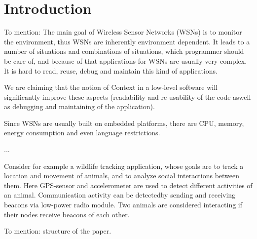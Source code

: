 \section{Introduction} To mention: The main goal of Wireless Sensor Networks
(WSNs) is to monitor the environment, thus WSNs are inherently environment
dependent. It leads to a number of situations and combinations of situations,
which programmer should be care of, and because of that applications for WSNs
are usually very complex. It is hard to read, reuse, debug and maintain this
kind of applications.

We are claiming that the notion of Context in a low-level software will
significantly improve these aspects (readability and re-usability of the code
aswell as debugging and maintaining of the application).

Since WSNs are usually built on embedded platforms, there are CPU, memory,
energy consumption and even language restrictions.

...

Consider for example a wildlife tracking application\cite{pasztor10}, whose
goals are to track a location and movement of animals, and to analyze social
interactions between them. Here GPS-sensor and accelerometer are used to detect
different activities of an animal. Communication activity can be detectedby
sending and receiving beacons via low-power radio module. Two animals are
considered interacting if their nodes receive beacons of each other.

To mention: structure of the paper.